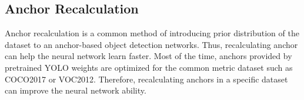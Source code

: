   


  \subsection{Anchor Recalculation}
  \label{section:anchor_recalc_study}
  Anchor recalculation is a common method of introducing prior distribution of the dataset to an anchor-based object
  detection networks. Thus, recalculating anchor can help the neural network learn faster.
  Most of the time, anchors provided by pretrained YOLO weights are optimized for the common metric
  dataset such as COCO2017 or VOC2012. 
  Therefore, recalculating anchors in a specific dataset can improve the neural network ability.

